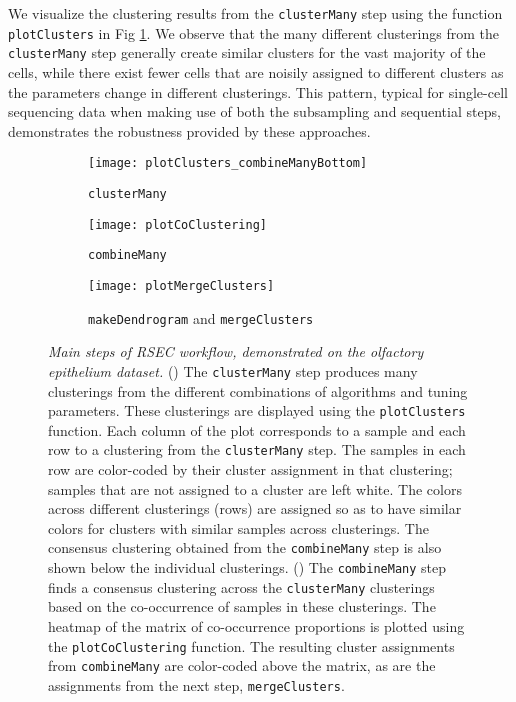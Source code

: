 \documentclass[10pt,letterpaper]{article}
\newcommand{\f}[1]{\texttt{#1}}
\begin{document}
We visualize the clustering results from the \f{clusterMany} step using the function \f{plotClusters} in Fig \ref{fig:OEPlotClusters_clusterMany}. 
We observe that the many different clusterings from the \f{clusterMany} step generally create similar clusters for the vast majority of the cells, while there exist fewer cells that are noisily assigned to different clusters as the parameters change in different clusterings. This pattern, typical for single-cell sequencing data when making use of both the subsampling and sequential steps, demonstrates the robustness provided by these approaches. 

\begin{figure}
\centering
	\centering
	\begin{subfigure}{.45\textwidth}
	\texttt{[image: plotClusters\_combineManyBottom]}
\caption{\f{clusterMany}	\label{fig:OEPlotClusters_clusterMany}
}
	\end{subfigure}
	\begin{subfigure}{.45\textwidth}
	\texttt{[image: plotCoClustering]}
	\caption{ \f{combineMany}\label{fig:OECoClusters}}
\end{subfigure}
	\begin{subfigure}{.45\textwidth}
	\texttt{[image: plotMergeClusters]}
	\caption{\f{makeDendrogram} and \f{mergeClusters}\label{fig:OEmergeClusters}}
	\end{subfigure}
	\caption{
    {\em Main steps of RSEC workflow, demonstrated on the olfactory epithelium dataset.}
	(\protect{}) The \f{clusterMany} step produces many clusterings from the different combinations of algorithms and tuning parameters. These clusterings are displayed using the \f{plotClusters} function. Each column of the plot corresponds to a sample and each row to a clustering from the \f{clusterMany} step. The samples in each row are color-coded by their cluster assignment in that clustering; samples that are not assigned to a cluster are left white. The colors across different clusterings (rows) are assigned so as to have similar colors for clusters with similar samples across clusterings. The consensus clustering obtained from the \f{combineMany} step is also shown below the individual clusterings. 
(\protect{})
The \f{combineMany} step finds a consensus clustering across the \f{clusterMany} clusterings based on the co-occurrence of samples in these clusterings. The heatmap of the matrix of co-occurrence proportions is plotted using the \f{plotCoClustering} function. The resulting cluster assignments from \f{combineMany} are color-coded above the matrix, as are the assignments from the next step, \f{mergeClusters}.
}
\end{figure}
\end{document}
